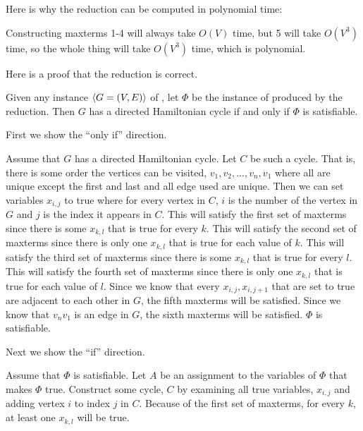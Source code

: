 \documentclass[11pt]{article}
\begin{document}
\begin{problems}
  \medskip 
  Here is why the reduction can be computed in polynomial time:
  
  \lineacross 
  Constructing maxterms 1-4 will always take $O(V)$ time, but 5 will take $O(V^3)$ time, 
    so the whole thing will take $O(V^3)$ time, which is polynomial.
  \lineacross 

  \medskip 
  Here is a proof that the reduction is correct.
  \begin{lemma}
    Given any instance $\langle G=(V,E) \rangle$ of ,
    let $\Phi$ be the instance of  produced by the reduction.
    Then $G$ has a directed Hamiltonian cycle 
    if and only if $\Phi$ is satisfiable.
  \end{lemma}
  \begin{longFormProof}
    \step First we show the ``only if'' direction.
    \begin{block}[3oi]
      {Assume that $G$ has a directed Hamiltonian cycle.}
      \step Let $C$ be such a cycle.
      \step That is, there is some order the vertices can be visited, $v_1, v_2, ..., v_n, v_1$ where all are unique except the first and last and all edge used are unique.
      \step Then we can set variables $x_{i,j}$ to true where for every vertex in $C$, 
              $i$ is the number of the vertex in $G$ and $j$ is the index it appears in $C$.
      \step This will satisfy the first set of maxterms since there is some $x_{k,l}$ that is true for every $k$.
      \step This will satisfy the second set of maxterms since there is only one $x_{k,l}$ that is true for each value of $k$.
      \step This will satisfy the third set of maxterms since there is some $x_{k,l}$ that is true for every $l$.
      \step This will satisfy the fourth set of maxterms since there is only one $x_{k,l}$ that is true for each value of $l$.
      \step Since we know that every $x_{i,j}, x_{i,j+1}$ that are set to true are adjacent to each other in $G$, the fifth maxterms will be satisfied.
      \step Since we know that $v_nv_1$ is an edge in $G$, the sixth maxterms will be satisfied.
      \step $\Phi$ is satisfiable.
    \end{block} 
    \step Next we show the ``if'' direction.
    \begin{block}[3i]
      {Assume that $\Phi$ is satisfiable.}
      \step Let $A$ be an assignment to the variables of $\Phi$ that makes $\Phi$ true.
      \step Construct some cycle, $C$ by examining all true variables, $x_{i,j}$ and adding vertex $i$ to index $j$ in $C$.
      \step Because of the first set of maxterms, for every $k$, at least one $x_{k,l}$ will be true.

\end{block}
\end{longFormProof}
\end{problems}
\end{document}
